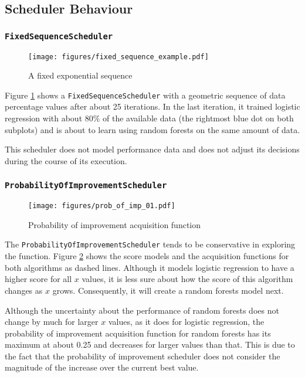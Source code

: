 \documentclass[a4paper,12pt,twoside,openright]{report}
\begin{document}
\subsection{Scheduler Behaviour}

\subsubsection{\texttt{FixedSequenceScheduler}}
\begin{figure}
\centering
  \texttt{[image: figures/fixed\_sequence\_example.pdf]}
  \caption{A fixed exponential sequence}
  \label{fixedsequenceexample}
\end{figure}

Figure \ref{fixedsequenceexample} shows a \texttt{FixedSequenceScheduler} with a geometric sequence of data percentage values after about 25 iterations. In the last iteration, it trained logistic regression with about 80\% of the available data (the rightmost blue dot on both subplots) and is about to learn using random forests on the same amount of data.

This scheduler does not model performance data and does not adjust its decisions during the course of its execution.


\subsubsection{\texttt{ProbabilityOfImprovementScheduler}}
\begin{figure}
\centering
  \texttt{[image: figures/prob\_of\_imp\_01.pdf]}
  \caption{Probability of improvement acquisition function}
  \label{sched:probofimpr1}
\end{figure}

The \texttt{ProbabilityOfImprovementScheduler} tends to be conservative in exploring the function. Figure \ref{sched:probofimpr1} shows the score models and the acquisition functions for both algorithms as dashed lines. Although it models logistic regression to have a higher score for all $x$ values, it is less sure about how the score of this algorithm changes as $x$ grows. Consequently, it will create a random forests model next.

Although the uncertainty about the performance of random forests does not change by much for larger $x$ values, as it does for logistic regression, the probability of improvement acquisition function for random forests has its maximum at about 0.25 and decreases for larger values than that. This is due to the fact that the probability of improvement scheduler does not consider the magnitude of the increase over the current best value.
\end{document}
